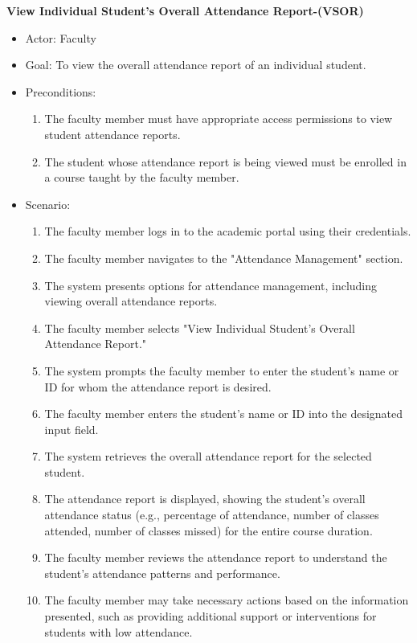 \documentclass[letterpaper,12pt,oneside,listof=totoc]{scrreprt}
\begin{document}
\hfill \break
\textbf{View Individual Student's Overall Attendance Report-(VSOR)}
\begin{itemize}
    \item Actor: Faculty
    \item Goal: To view the overall attendance report of an individual student.
    \item Preconditions:
    \begin{enumerate}
        \item The faculty member must have appropriate access permissions to view student attendance reports.
        \item The student whose attendance report is being viewed must be enrolled in a course taught by the faculty member.
    \end{enumerate}
    \item Scenario:
    \begin{enumerate}
        \item The faculty member logs in to the academic portal using their credentials.
        \item The faculty member navigates to the "Attendance Management" section.
        \item The system presents options for attendance management, including viewing overall attendance reports.
        \item The faculty member selects "View Individual Student’s Overall Attendance Report."
        \item The system prompts the faculty member to enter the student's name or ID for whom the attendance report is desired.
        \item The faculty member enters the student's name or ID into the designated input field.
        \item The system retrieves the overall attendance report for the selected student.
        \item The attendance report is displayed, showing the student's overall attendance status (e.g., percentage of attendance, number of classes attended, number of classes missed) for the entire course duration.
        \item The faculty member reviews the attendance report to understand the student's attendance patterns and performance.
        \item The faculty member may take necessary actions based on the information presented, such as providing additional support or interventions for students with low attendance.
    \end{enumerate}
\end{itemize}
\end{document}
